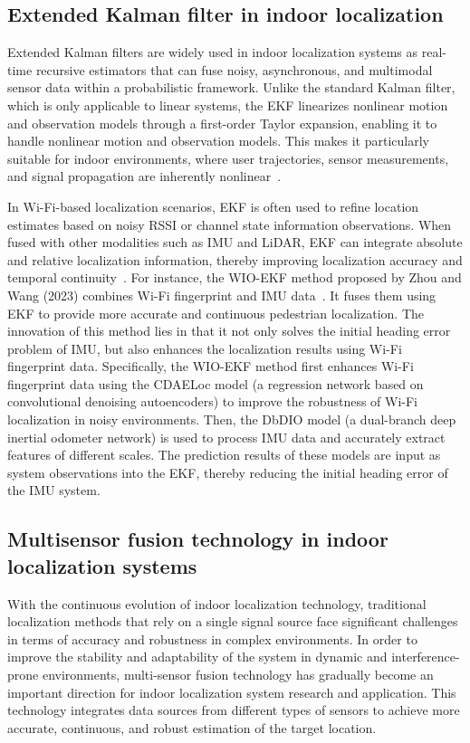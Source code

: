 \documentclass[12pt,a4paper]{article}
\numberwithin{equation}{section}
\begin{document}
\subsection{Extended Kalman filter in indoor localization}
Extended Kalman filters are widely used in indoor localization systems as
real-time recursive estimators that can fuse noisy, asynchronous, and multimodal
sensor data within a probabilistic framework. Unlike the standard Kalman filter,
which is only applicable to linear systems, the EKF linearizes nonlinear motion
and observation models through a first-order Taylor expansion, enabling it to
handle nonlinear motion and observation models. This makes it particularly
suitable for indoor environments, where user trajectories, sensor measurements,
and signal propagation are inherently nonlinear~\cite{barrau2015non}.

In Wi-Fi-based localization scenarios, EKF is often used to refine location
estimates based on noisy RSSI or channel state information observations. When
fused with other modalities such as IMU and LiDAR, EKF can integrate absolute
and relative localization information, thereby improving localization accuracy
and temporal continuity~\cite{laoudias2018survey}. For instance, the WIO-EKF
method proposed by Zhou and Wang (2023) combines Wi-Fi fingerprint and IMU
data~\cite{zhou2024wio}. It fuses them using EKF to provide more accurate and
continuous pedestrian localization. The innovation of this method lies in that
it not only solves the initial heading error problem of IMU, but also enhances
the localization results using Wi-Fi fingerprint data. Specifically, the WIO-EKF
method first enhances Wi-Fi fingerprint data using the CDAELoc model (a
regression network based on convolutional denoising
autoencoders) to
improve the robustness of Wi-Fi localization in noisy environments. Then, the
DbDIO model (a dual-branch deep inertial odometer network)
is used to process IMU
data and accurately extract features of different scales. The prediction results
of these models are input as system observations into the EKF, thereby reducing
the initial heading error of the IMU system.

\subsection{Multisensor fusion technology in indoor localization systems}
With the continuous evolution of indoor localization technology, traditional
localization methods that rely on a single signal source face significant
challenges in terms of accuracy and robustness in complex environments. In order
to improve the stability and adaptability of the system in dynamic and
interference-prone environments, multi-sensor fusion technology has gradually
become an important direction for indoor localization system research and
application. This technology integrates data sources from different types of
sensors to achieve more accurate, continuous, and robust estimation of the
target location.
\end{document}
